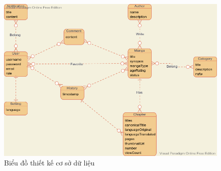 \documentclass[./../main.tex]{subfiles}
\begin{document}
\begin{figure}[H]
	\centering
	\includegraphics[width=\linewidth]{./images/image8.png}
	\caption{Biểu đồ thiết kế cơ sở dữ liệu}
\end{figure}
\end{document}
